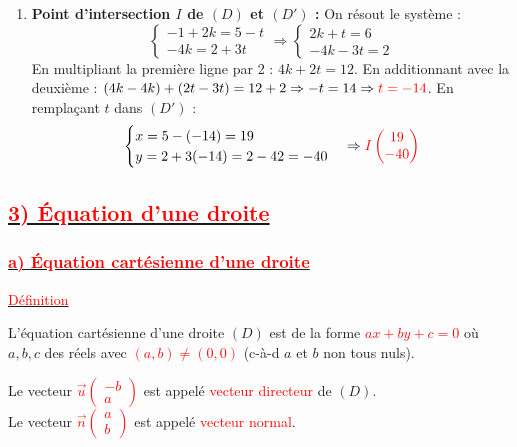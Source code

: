\documentclass[12pt,a4paper]{article}
\begin{document}
\begin{enumerate}
    \item \textbf{Point d'intersection $I$ de $(D)$ et $(D')$ :}
    On résout le système :
    \[
    \begin{cases} -1 + 2k = 5 - t \\ -4k = 2 + 3t \end{cases} \Rightarrow \begin{cases} 2k + t = 6 \\ -4k - 3t = 2 \end{cases}
    \]
    En multipliant la première ligne par 2 : $4k + 2t = 12$.
    En additionnant avec la deuxième : $(4k - 4k) + (2t - 3t) = 12 + 2 \Rightarrow -t = 14 \Rightarrow \textcolor{red}{t = -14}$.
    En remplaçant $t$ dans $(D')$ :
    \[ \begin{cases} x = 5 - (-14) = 19 \\ y = 2 + 3(-14) = 2 - 42 = -40 \end{cases} \Rightarrow \text{\textcolor{red}{$I \begin{pmatrix} 19 \\ -40 \end{pmatrix}$}} \]
\end{enumerate}

\subsection*{\underline{\textcolor{red}{3) Équation d'une droite}}}

\subsubsection*{\underline{\textcolor{red}{a) Équation cartésienne d'une droite}}}

\underline{\textcolor{red}{Définition}}

L'équation cartésienne d'une droite $(D)$ est de la forme \textcolor{red}{$ax + by + c = 0$} où $a, b, c$ des réels avec \textcolor{red}{$(a, b) \neq (0, 0)$} (c-à-d $a$ et $b$ non tous nuls).

Le vecteur \textcolor{red}{$\vec{u} \begin{pmatrix} -b \\ a \end{pmatrix}$} est appelé \textcolor{red}{vecteur directeur} de $(D)$. \\
Le vecteur \textcolor{red}{$\vec{n} \begin{pmatrix} a \\ b \end{pmatrix}$} est appelé \textcolor{red}{vecteur normal}.
\end{document}
